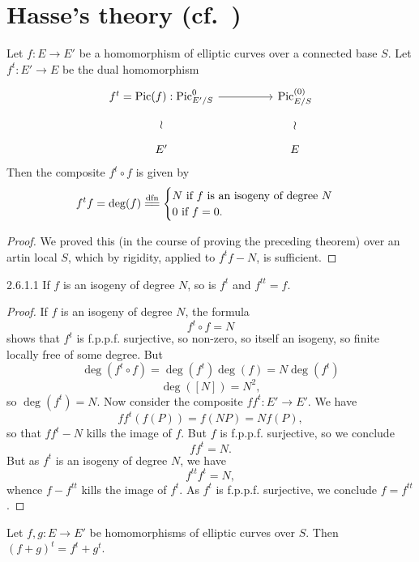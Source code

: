 \section{Hasse's theory (cf.~\cite{H})}
\label{sec:2.6}

\begin{theorem}\label{thm:2.6.1}
Let $f : E \to E'$ be a homomorphism of elliptic curves over a connected base $S$. Let $f^t : E' \to E$ be the dual homomorphism
\[
\begin{tikzcd}[row sep=large, column sep=huge]
  f^t = \Pic(f) : \Pic^0_{E'/S} \arrow[r] & \Pic^{(0)}_{E/S} \\
  E' \arrow[u, phantom, "\wr"] & E \arrow[u, phantom, "\wr"]
\end{tikzcd}
\]
Then the composite $f^t \circ f$ is given by
\[
f^t f = \deg(f) \xlongequal{dfn} \begin{cases} N \text{ if } f \text{ is an isogeny of degree } N \\ 0 \text{ if } f = 0. \end{cases}
\]
\end{theorem}

\begin{proof}
We proved this (in the course of proving the preceding theorem) over an artin local $S$, which by rigidity, applied to $f^t f - N$, is sufficient.
\end{proof}

\begin{customcor}{2.6.1.1}\label{cor:2.6.1.1}
If $f$ is an isogeny of degree $N$, so is $f^t$ and $f^{tt} = f$.
\end{customcor}

\begin{proof}
If $f$ is an isogeny of degree $N$, the formula
\[
f^t \circ f = N
\]
shows that $f^t$ is f.p.p.f. surjective, so non-zero, so itself an isogeny, so finite locally free of some degree. But
\[
\deg(f^t \circ f) = \deg(f^t)\deg(f) = N \deg(f^t)
\]
\[
\deg([N]) = N^2,
\]
so $\deg(f^t) = N$. Now consider the composite $ff^t : E' \to E'$. We have
\[
ff^t(f(P)) = f(NP) = Nf(P),
\]
so that $ff^t - N$ kills the image of $f$. But $f$ is f.p.p.f. surjective, so we conclude
\[
ff^t = N.
\]
But as $f^t$ is an isogeny of degree $N$, we have
\[
f^{tt}f^t = N,
\]
whence $f - f^{tt}$ kills the image of $f^t$. As $f^t$ is f.p.p.f. surjective, we conclude $f = f^{tt}$.
\end{proof}

\begin{theorem}\label{thm:2.6.2}
Let $f, g : E \to E'$ be homomorphisms of elliptic curves over $S$. Then $(f + g)^t = f^t + g^t$.
\end{theorem}

